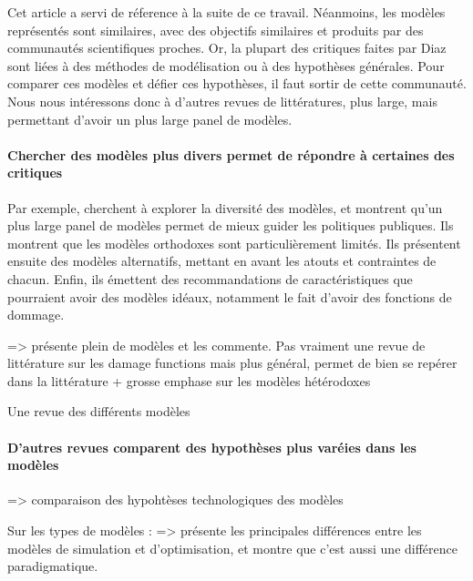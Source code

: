 Cet article a servi de réference à la suite de ce travail. Néanmoins, les modèles représentés sont similaires, avec des objectifs similaires et produits par des communautés scientifiques proches. Or, la plupart des critiques faites par Diaz sont liées à des méthodes de modélisation ou  à des hypothèses générales. Pour comparer ces modèles et défier ces hypothèses, il faut sortir de cette communauté.  \\


Nous nous intéressons donc à d'autres revues de littératures, plus large, mais permettant d'avoir un plus large panel de modèles. 

\paragraph{Chercher des modèles plus divers permet de répondre à certaines des critiques}


Par exemple, \cite{souffron_successful_2024} cherchent à explorer la diversité des modèles, et montrent qu'un plus large panel de modèles permet de mieux guider les politiques publiques. Ils montrent que les modèles orthodoxes sont particulièrement limités. Ils présentent ensuite des modèles alternatifs, mettant en avant les atouts et contraintes de chacun. Enfin, ils émettent des recommandations de caractéristiques que pourraient avoir des modèles idéaux, notamment le fait d'avoir des fonctions de dommage. 






\cite{souffron_successful_2024} => présente plein de modèles et les commente. Pas vraiment une revue de littérature sur les damage functions mais plus général, permet de bien se repérer dans la littérature + grosse emphase sur les modèles hétérodoxes

\cite{review of information on models}  Une revue des différents modèles 

\paragraph{D'autres revues comparent des hypothèses plus varéies dans les modèles}

\cite{krey_looking_2019} => comparaison des hypohtèses technologiques des modèles

Sur les types de modèles : 
\cite{mercure_modelling_2019} => présente les principales différences entre les modèles de simulation et d'optimisation, et montre que c'est aussi une différence paradigmatique. 

